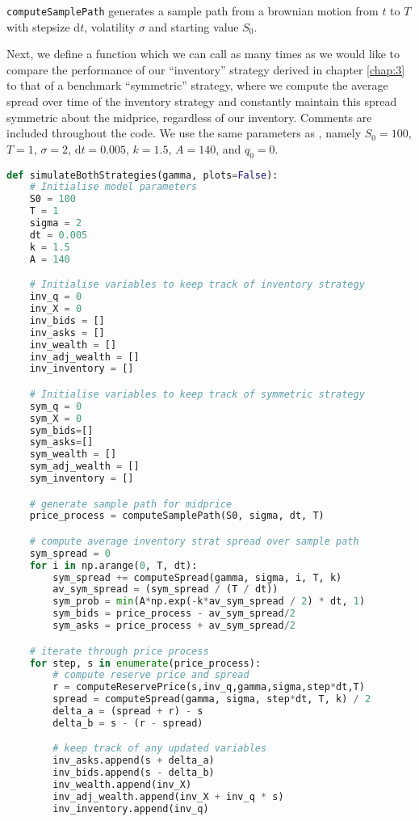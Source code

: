 \texttt{computeSamplePath} generates a sample path from a brownian motion
from $t$ to $T$ with stepsize $\mathrm dt$, volatility $\sigma$ and starting
value $S_0$.

Next, we define a function which we can call as many times as we 
would like to compare the performance of our ``inventory'' strategy
derived in chapter \ref{chap:3} to that of a benchmark ``symmetric''
strategy, where we compute the average spread over time of the inventory
strategy and constantly maintain this spread symmetric about the midprice,
regardless of our inventory. Comments are included throughout the code.
We use the same parameters as \cite{AS2008}, namely $S_0=100$,
$T=1$, $\sigma=2$, $\mathrm dt=0.005$, $k=1.5$, $A=140$, and $q_0=0$.

\begin{lstlisting}[language=Python, caption=Avellaneda-Stoikov Model]
def simulateBothStrategies(gamma, plots=False):
    # Initialise model parameters
    S0 = 100
    T = 1
    sigma = 2
    dt = 0.005
    k = 1.5
    A = 140

    # Initialise variables to keep track of inventory strategy
    inv_q = 0
    inv_X = 0
    inv_bids = []
    inv_asks = []
    inv_wealth = []
    inv_adj_wealth = []
    inv_inventory = []

    # Initialise variables to keep track of symmetric strategy
    sym_q = 0 
    sym_X = 0
    sym_bids=[]
    sym_asks=[]
    sym_wealth = []
    sym_adj_wealth = []
    sym_inventory = []

    # generate sample path for midprice
    price_process = computeSamplePath(S0, sigma, dt, T)

    # compute average inventory strat spread over sample path
    sym_spread = 0 
    for i in np.arange(0, T, dt):
        sym_spread += computeSpread(gamma, sigma, i, T, k)
        av_sym_spread = (sym_spread / (T / dt))
        sym_prob = min(A*np.exp(-k*av_sym_spread / 2) * dt, 1)
        sym_bids = price_process - av_sym_spread/2
        sym_asks = price_process + av_sym_spread/2

    # iterate through price process
    for step, s in enumerate(price_process):
        # compute reserve price and spread
        r = computeReservePrice(s,inv_q,gamma,sigma,step*dt,T)
        spread = computeSpread(gamma, sigma, step*dt, T, k) / 2
        delta_a = (spread + r) - s
        delta_b = s - (r - spread)

        # keep track of any updated variables
        inv_asks.append(s + delta_a)
        inv_bids.append(s - delta_b)
        inv_wealth.append(inv_X)
        inv_adj_wealth.append(inv_X + inv_q * s)
        inv_inventory.append(inv_q)


\end{lstlisting}
